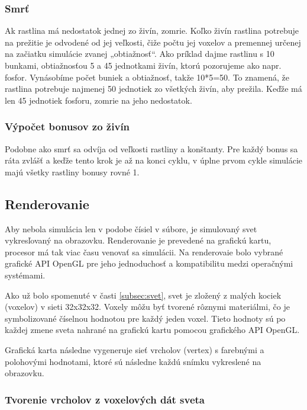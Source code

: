 \documentclass[12pt]{article}
\begin{document}
\subsubsection{Smrť}

Ak rastlina má nedostatok jednej zo živín, zomrie. Koľko živín rastlina
potrebuje na prežitie je odvodené od jej veľkosti, čiže počtu jej voxelov
a premennej určenej na začiatku simulácie zvanej „obtiažnosť“. Ako príklad
dajme rastlinu s 10 bunkami, obtiažnosťou 5 a 45 jednotkami živín, ktorú
pozorujeme ako napr. fosfor. Vynásobíme počet buniek a obtiažnosť, takže
10*5=50. To znamená, že rastlina potrebuje najmenej 50 jednotiek zo všetkých
živín, aby prežila. Keďže má len 45 jednotiek fosforu, zomrie na jeho
nedostatok.

\subsubsection{Výpočet bonusov zo živín}

Podobne ako smrť sa odvíja od veľkosti rastliny a konštanty. Pre každý bonus
sa ráta zvlášť a keďže tento krok je až na konci cyklu, v úplne prvom cykle
simulácie majú všetky rastliny bonusy rovné 1.

\newpage
\subsection{Renderovanie}

Aby nebola simulácia len v podobe čísiel v súbore, je simulovaný svet
vykresľovaný na obrazovku. Renderovanie je prevedené na grafickú kartu,
procesor má tak viac času venovať sa simulácii. Na renderovaie bolo vybrané
grafické API OpenGL pre jeho jednoduchosť a kompatibilitu medzi operačnými
systémami.

Ako už bolo spomenuté v časti \ref{subsec:svet}, svet je zložený z malých
kociek (voxelov) v sieti 32x32x32. Voxely môžu byť tvorené rôznymi materiálmi,
čo je symbolizované číselnou hodnotou pre každý jeden voxel. Tieto
hodnoty sú po každej zmene sveta nahrané na grafickú kartu pomocou grafického
API OpenGL.

Grafická karta následne vygeneruje sieť vrcholov (vertex) s farebnými a
polohovými hodnotami, ktoré sú následne každú snímku vykreslené na obrazovku.

\subsubsection{Tvorenie vrcholov z voxelových dát sveta}
\end{document}
